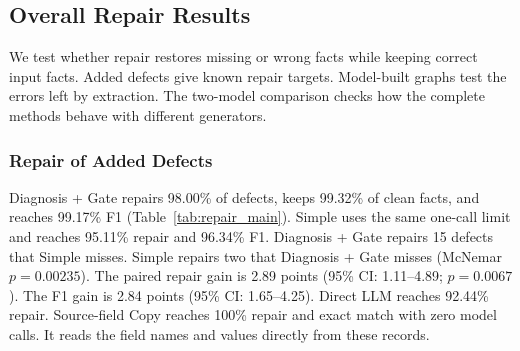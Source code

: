 \subsection{Overall Repair Results}
\label{sec:eval:overall_results}

We test whether repair restores missing or wrong facts while keeping
correct input facts. Added defects give known repair targets.
Model-built graphs test the errors left by extraction.
The two-model comparison checks how the complete methods behave with
different generators.

\subsubsection{Repair of Added Defects}
\label{sec:eval:overall}

Diagnosis + Gate repairs 98.00\% of defects, keeps 99.32\% of clean facts,
and reaches 99.17\% F1 (Table~\ref{tab:repair_main}).
Simple uses the same one-call limit and reaches 95.11\% repair and 96.34\%
F1. Diagnosis + Gate repairs 15 defects that Simple misses.
Simple repairs two that Diagnosis + Gate misses (McNemar $p=0.00235$).
The paired repair gain is 2.89 points (95\% CI: 1.11--4.89; $p=0.0067$).
The F1 gain is 2.84 points (95\% CI: 1.65--4.25).
Direct LLM reaches 92.44\% repair.
Source-field Copy reaches 100\% repair and exact match with zero model calls.
It reads the field names and values directly from these records.

\begin{table}[t]
\centering
\caption{Repair on 225 test documents with 450 added defects. Lower over-repair, call count, and request time are better.}
\label{tab:repair_main}
\small
{}
\end{table}

